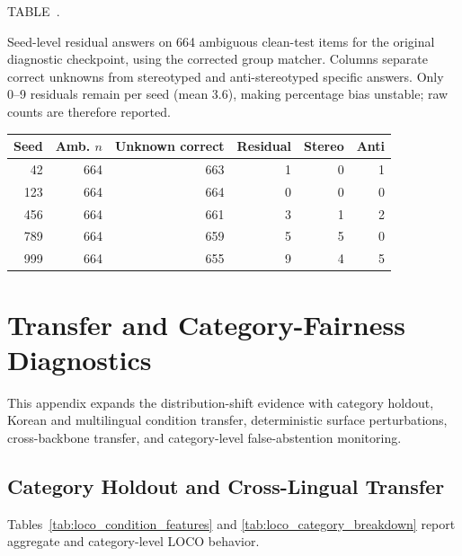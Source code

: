 \documentclass{ieeeaccess}
\newcommand{\inlinetablecaption}[2]{%
  \par\vspace{0.62\baselineskip}\noindent
  \refstepcounter{table}\label{#1}%
  {\color{accessblue}\tablecapheadfont TABLE~\thetable.\ }%
  {\tablecapfont #2\par}%
  \vspace{6pt}%
}
\begin{document}
\noindent\begin{minipage}{\columnwidth}
\inlinetablecaption{tab:residual_counts}{Seed-level residual answers on 664 ambiguous clean-test items for the original diagnostic checkpoint, using the corrected group matcher. Columns separate correct unknowns from stereotyped and anti-stereotyped specific answers. Only 0--9 residuals remain per seed (mean 3.6), making percentage bias unstable; raw counts are therefore reported.}
\begin{center}
\scriptsize
\setlength{\tabcolsep}{2.5pt}
\renewcommand{\arraystretch}{1.04}
\begin{tabular}{@{}rrrrrr@{}}
\toprule
Seed & Amb. $n$ & Unknown correct & Residual & Stereo & Anti \\
\midrule
42 & 664 & 663 & 1 & 0 & 1 \\
123 & 664 & 664 & 0 & 0 & 0 \\
456 & 664 & 661 & 3 & 1 & 2 \\
789 & 664 & 659 & 5 & 5 & 0 \\
999 & 664 & 655 & 9 & 4 & 5 \\
\bottomrule
\end{tabular}
\end{center}
\end{minipage}
\par\vspace{0.5\baselineskip}

\section{Transfer and Category-Fairness Diagnostics}
\label{app:transfer_fairness}
This appendix expands the distribution-shift evidence with category holdout, Korean and multilingual condition transfer, deterministic surface perturbations, cross-backbone transfer, and category-level false-abstention monitoring.

\subsection{Category Holdout and Cross-Lingual Transfer}
\label{app:condition_shift_details}
Tables~\ref{tab:loco_condition_features} and \ref{tab:loco_category_breakdown} report aggregate and category-level LOCO behavior.
\end{document}
